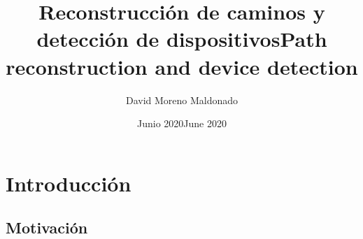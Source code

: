 \documentclass[twoside, 12pt]{epstfg}
\title[spa]{Reconstrucción de caminos y detección de dispositivos}
\title[eng]{Path reconstruction and device detection}
\author{David Moreno Maldonado}
\date[spa]{Junio 2020}
\date[eng]{June 2020}
\begin{document}

\frontmatter

\maketitle[spa]

\makeinnertitle[spa]


\tableofcontents
\clearpage
\listoftables
\clearpage
\listoffigures


\printnoidxglossaries

\mainmatter

\chapter{Introducción}

\section{Motivación}

\end{document}
